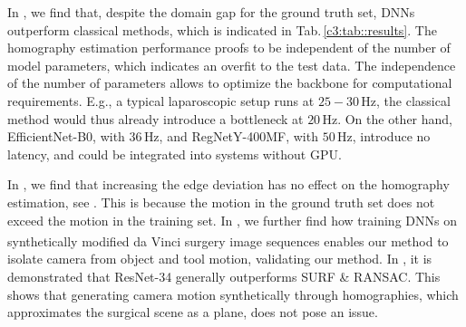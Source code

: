 In , we find that, despite the domain gap for the ground truth set, DNNs outperform classical methods, which is indicated in Tab.\,\ref{c3:tab::results}. The homography estimation performance proofs to be independent of the number of model parameters, which indicates an overfit to the test data. The independence of the number of parameters allows to optimize the backbone for computational requirements. E.g., a typical laparoscopic setup runs at $25-30\,\text{Hz}$, the classical method would thus already introduce a bottleneck at $20\,\text{Hz}$. On the other hand, EfficientNet-B0, with $36\,\text{Hz}$, and RegNetY-400MF, with $50\,\text{Hz}$, introduce no latency, and could be integrated into systems without GPU.


In , we find that increasing the edge deviation has no effect on the homography estimation, see . This is because the motion in the ground truth set does not exceed the motion in the training set. In , we further find how training DNNs on synthetically modified da Vinci\textsuperscript{\textregistered} surgery image sequences enables our method to isolate camera from object and tool motion, validating our method. In , it is demonstrated that ResNet-34 generally outperforms SURF \& RANSAC. This shows that generating camera motion synthetically through homographies, which approximates the surgical scene as a plane, does not pose an issue.


